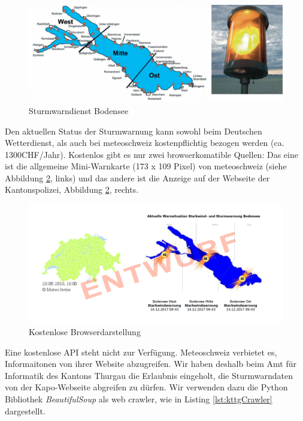 \begin{figure}[h!]
	\centering
	\includegraphics[width=1\linewidth]{img/sturm2}
	\caption{Sturmwarndienst Bodensee}
	\label{img:sturm2}
\end{figure}

Den aktuellen Status der Sturmwarnung kann sowohl beim Deutschen Wetterdienst, als auch bei meteoschweiz kostenpflichtig bezogen werden (ca. 1300CHF/Jahr). Kostenlos gibt es nur zwei browserkomatible Quellen: Das eine ist die allgemeine Mini-Warnkarte (173 x 109 Pixel) von meteoschweiz (siehe Abbildung \ref{img:sturm}, links) und das andere ist die Anzeige auf der Webseite der Kantonspolizei, Abbildung \ref{img:sturm}, rechts.

\begin{figure}[h!]
	\centering
	\includegraphics[width=1\linewidth]{img/sturm}
	\caption{Kostenlose Browserdarstellung}
	\label{img:sturm}
\end{figure}

Eine kostenlose API steht nicht zur Verfügung. Meteoschweiz verbietet es, Informaitonen von ihrer Website abzugreifen. Wir haben deshalb beim Amt für Informatik des Kantons Thurgau die Erlaubnis eingeholt, die Sturmwarndaten von der Kapo-Webseite abgreifen zu dürfen. Wir verwenden dazu die Python Bibliothek \textit{BeautifulSoup} als web crawler, wie in Listing \ref{lst:kttgCrawler} dargestellt. \newline


